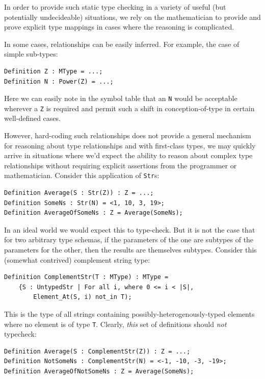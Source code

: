 In order to provide such static type checking in a variety of useful (but potentially undecideable) situations, we rely on the mathematician to provide and prove explicit type mappings in cases where the reasoning is complicated.

In some cases, relationships can be easily inferred.  For example, the case of simple sub-types:

\begin{lstlisting}
Definition Z : MType = ...;
Definition N : Power(Z) = ...;
\end{lstlisting}

Here we can easily note in the symbol table that an \texttt{N} would be acceptable wherever a \texttt{Z} is required and permit such a shift in conception-of-type in certain well-defined cases.

However, hard-coding such relationships does not provide a general mechanism for reasoning about type relationships and with first-class types, we may quickly arrive in situations where we'd expect the ability to reason about complex type relationships without requiring explicit assertions from the programmer or mathematician.  Consider this application of \texttt{Str}s:

\begin{lstlisting}
Definition Average(S : Str(Z)) : Z = ...;
Definition SomeNs : Str(N) = <1, 10, 3, 19>;
Definition AverageOfSomeNs : Z = Average(SomeNs);
\end{lstlisting}

In an ideal world we would expect this to type-check.  But it is not the case that for two arbitrary type schemas, if the parameters of the one are subtypes of the parameters for the other, then the results are themselves subtypes.  Consider this (somewhat contrived) complement string type:

\begin{lstlisting}
Definition ComplementStr(T : MType) : MType = 
	{S : UntypedStr | For all i, where 0 <= i < |S|,
		Element_At(S, i) not_in T);
\end{lstlisting}

This is the type of all strings containing possibly-heterogenously-typed elements where no element is of type \texttt{T}.  Clearly, \emph{this} set of definitions should \emph{not} typecheck:

\begin{lstlisting}
Definition Average(S : ComplementStr(Z)) : Z = ...;
Definition NotSomeNs : ComplementStr(N) = <-1, -10, -3, -19>;
Definition AverageOfNotSomeNs : Z = Average(SomeNs);
\end{lstlisting}

